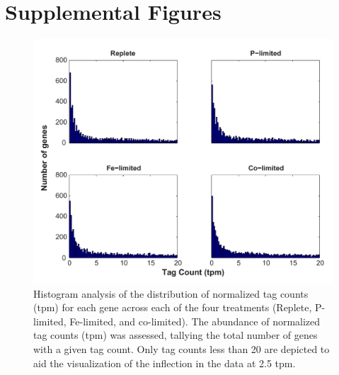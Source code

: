 \chapter{Supplemental Figures}

\begin{figure}
  \centering
    \includegraphics[width=1\textwidth]{Images/C2_FigureS1_v6.pdf}
    \caption[Distribution of normalized tag counts across treatments]{Histogram analysis of the distribution of normalized tag counts (tpm) for each gene across each of the four treatments (Replete, P-limited, Fe-limited, and co-limited). The abundance of normalized tag counts (tpm) was assessed, tallying the total number of genes with a given tag count. Only tag counts less than 20 are depicted to aid the visualization of the inflection in the data at 2.5 tpm.}
  \label{fig:a1f1}
\end{figure}

